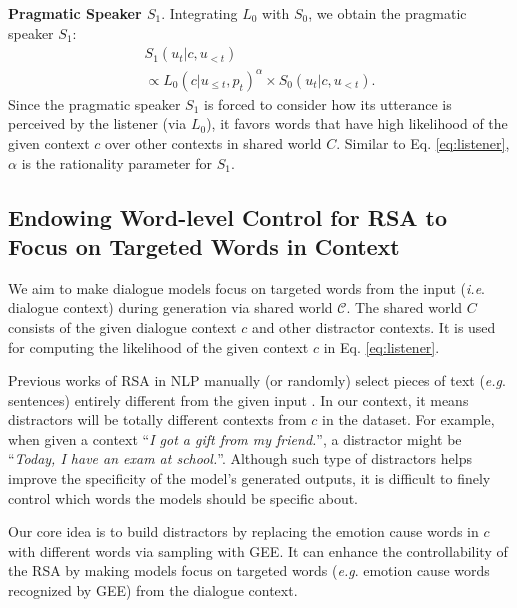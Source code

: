 \documentclass[11pt]{article}
\makeatletter
\DeclareRobustCommand\onedot{\futurelet\@let@token\@onedot}
\def\onedot{. }
\def\eg{\emph{e.g}\onedot} \def\Eg{\emph{E.g}\onedot}
\def\ie{\emph{i.e}\onedot} \def\Ie{\emph{I.e}\onedot}
\makeatother
\begin{document}
\textbf{Pragmatic Speaker $S_1$}.
Integrating $L_0$ with $S_0$, we obtain the pragmatic speaker $S_1$:
\begin{multline}
    S_1(u_t|c, u_{<t}) \\
    \propto L_0(c|u_{\leq t}, p_t)^\alpha \times S_0(u_t|c, u_{<t}).
    \label{eq:s1}
\end{multline}
Since the pragmatic speaker $S_1$ is forced to consider how its utterance is perceived by the listener (via $L_0$),
it favors words that have high likelihood of the given context $c$ over other contexts in shared world $C$.
Similar to Eq. \ref{eq:listener}, $\alpha$ is the rationality parameter for $S_1$.


\subsection{Endowing Word-level Control for RSA \newline to Focus on Targeted Words in Context}
\label{subsec:world}

We aim to make dialogue models focus on targeted words from the input (\ie dialogue context) during generation via shared world $\mathcal{C}$.
The shared world $C$ consists of the given dialogue context $c$ and other distractor contexts.
It is used for computing the likelihood of the given context $c$ in Eq. \ref{eq:listener}.


Previous works of RSA in NLP manually (or randomly) select pieces of text (\eg sentences) entirely different from the given input \citep{Cohn:2019:NAACL, Shen:2019:NAACL, Kim:2020:EMNLP}.
In our context, it means distractors will be totally different contexts from $c$ in the dataset.
For example, when given a context ``\textit{I got a gift from my friend.}'', a distractor might be ``\textit{Today, I have an exam at school.}''.
Although such type of distractors helps improve the specificity of the model's generated outputs,
it is difficult to finely control which words the models should be specific about.



Our core idea is to build distractors by replacing the emotion cause words in $c$ with different words via sampling with GEE.
It can enhance the controllability of the RSA by making models focus on targeted words (\eg emotion cause words recognized by GEE) from the dialogue context.
\end{document}

